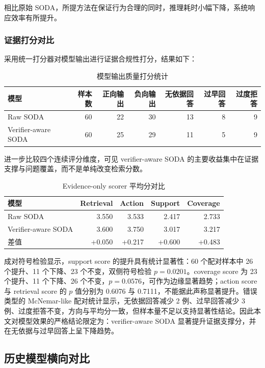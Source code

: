 \documentclass[UTF8,a4paper,12pt]{ctexart}
\begin{document}
相比原始 SODA，所提方法在保证行为合理的同时，推理耗时小幅下降，系统响应效率有所提升。

\subsubsection{证据打分对比}

采用统一打分器对模型输出进行证据合规性打分，结果如下：

\begin{table}[htbp]
\centering
\small
\begin{tabular}{lrrrrrr}
\toprule
模型 & 样本数 & 正向输出 & 负向输出 & 无依据回答 & 过早回答 & 过度拒答 \\
\midrule
Raw SODA & 60 & 22 & 30 & 13 & 8 & 9 \\
Verifier-aware SODA & 60 & 25 & 29 & 11 & 5 & 9 \\
\bottomrule
\end{tabular}
\caption{模型输出质量打分统计}
\end{table}

进一步比较四个连续评分维度，可见 verifier-aware SODA 的主要收益集中在证据支撑与问题覆盖，而不是单纯改变检索分数。

\begin{table}[htbp]
\centering
\small
\begin{tabular}{lrrrr}
\toprule
模型 & Retrieval & Action & Support & Coverage \\
\midrule
Raw SODA & 3.550 & 3.533 & 2.417 & 2.733 \\
Verifier-aware SODA & 3.600 & 3.750 & 3.017 & 3.217 \\
差值 & +0.050 & +0.217 & +0.600 & +0.483 \\
\bottomrule
\end{tabular}
\caption{Evidence-only scorer 平均分对比}
\end{table}

成对符号检验显示，support score 的提升具有统计显著性：60 个配对样本中 26 个提升、11 个下降、23 个不变，双侧符号检验 $p=0.0201$。coverage score 为 23 个提升、11 个下降、26 个不变，$p=0.0576$，可作为边缘显著趋势；action score 与 retrieval score 的 $p$ 值分别为 0.6076 与 0.7111，不能据此声称显著提升。错误类型的 McNemar-like 配对统计显示，无依据回答减少 2 例、过早回答减少 3 例、过度拒答不变，方向与平均分一致，但样本量不足以支持显著性结论。因此本文对模型效果的严格结论限定为：verifier-aware SODA 显著提升证据支撑分，并在无依据与过早回答上呈下降趋势。

\subsection{历史模型横向对比}
\end{document}
